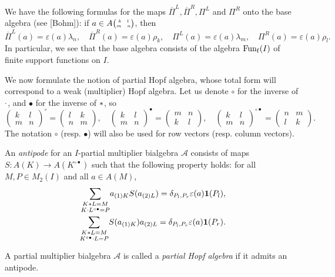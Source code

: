 
\begin{Rem}
We have the following formulas for the maps $\overline{\Pi}^L,\overline{\Pi}^R,\Pi^L$ and $\Pi^R$ onto the base algebra (see [Bohm]): if $a\in A{{\tiny \begin{pmatrix} k \quad l \\ m \quad n\end{pmatrix}}}$, then \[ \overline{\Pi}^L(a) =\varepsilon(a)\lambda_n,\quad \overline{\Pi}^R(a) =\varepsilon(a)\rho_k,\quad \Pi^L(a) =\varepsilon(a)\lambda_m,\quad \Pi^R(a) = \varepsilon(a) \rho_l.\] In particular, we see that the base algebra consists of the algebra $\mathrm{Fun}_{\operatorname{\mathrm{f}}}(I)$ of finite support functions on $I$. 
\end{Rem}




We now formulate the notion of partial Hopf algebra, whose total form will correspond to a weak (multiplier) Hopf algebra. Let us denote $\circ$ for the inverse of $\cdot$, and $\bullet$ for the inverse of $*$, so \[\begin{pmatrix} k & l \\ m & n \end{pmatrix}^{\circ} = \begin{pmatrix} l & k \\ n & m \end{pmatrix},\quad \begin{pmatrix} k & l \\ m & n \end{pmatrix}^{\bullet} = \begin{pmatrix} m & n \\ k & l \end{pmatrix},\quad \begin{pmatrix} k & l \\ m & n \end{pmatrix}^{\circ \bullet} = \begin{pmatrix} n & m \\ l & k \end{pmatrix}.\] The notation $\circ$ (resp. $\bullet$) will also be used for row vectors (resp. column vectors).

\begin{Def}\label{DefPartBiAlgAnt} An \emph{antipode} for an $I$-partial multiplier bialgebra $\mathscr{A}$ consists of maps $S:A(K)\rightarrow A(K^{\circ\bullet})$
such that the following property holds: for all $M,P\in M_2(I)$ and all $a\in A(M)$, \begin{eqnarray*} \underset{K\cdot L^{\circ\bullet}=P}{\sum_{K* L = M}} a_{(1)K}S(a_{(2)L})= \delta_{P_l,P_r}\varepsilon(a)\mathbf{1}(P_l),\\\underset{K^{\circ\bullet}\cdot L=P}{\sum_{K* L = M}} S(a_{(1)K})a_{(2)L}= \delta_{P_l,P_r}\varepsilon(a)\mathbf{1}(P_r).\end{eqnarray*}

A partial multiplier bialgebra $\mathscr{A}$ is called a \emph{partial Hopf algebra} if it admits an antipode.
\end{Def} 

